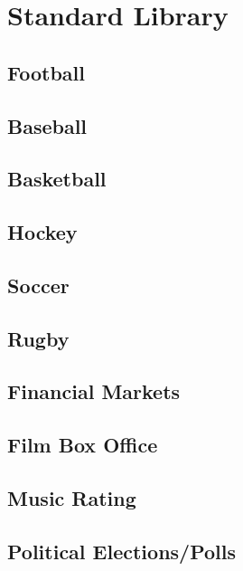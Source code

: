 \documentclass[12pt]{report}
\begin{document}
\chapter{Standard Library}
\section{Football}
\section{Baseball}
\section{Basketball}
\section{Hockey}
\section{Soccer}
\section{Rugby}
\section{Financial Markets}
\section{Film Box Office}
\section{Music Rating}
\section{Political Elections/Polls}
\end{document}
